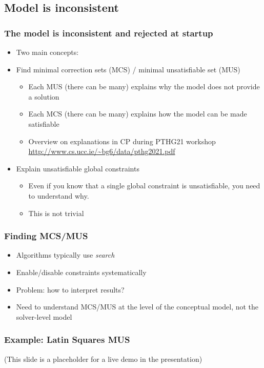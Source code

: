 \documentclass[dvipsnames,aspectratio=169]{beamer}
\begin{document}
\subsection{Model is inconsistent}

\begin{frame}
\frametitle{The model is inconsistent and rejected at startup}
\vspace{5em}
\begin{itemize}
\item Two main concepts:
\item Find minimal correction sets (MCS) / minimal unsatisfiable set (MUS)
\begin{itemize}
\item Each MUS (there can be many) explains why the model does not provide a solution
\item Each MCS (there can be many) explains how the model can be made satisfiable
\item Overview on explanations in CP during PTHG21 workshop \url{http://www.cs.ucc.ie/~bg6/data/pthg2021.pdf}\cite{DBLP:conf/ijcai/GuptaGO21}
\end{itemize}
\item Explain unsatisfiable global constraints
\begin{itemize}
\item Even if you know that a single global constraint is unsatisfiable, you need to understand why.
\item This is not trivial
\end{itemize}
\end{itemize}
\end{frame}

\begin{frame}
\frametitle{Finding MCS/MUS}
\begin{itemize}
\item Algorithms typically use \emph{search}
\item Enable/disable constraints systematically
\item Problem: how to interpret results?
\item Need to understand MCS/MUS at the level of the conceptual model, not the solver-level model
\end{itemize}
\end{frame}

\begin{frame}
\frametitle{Example: Latin Squares MUS}

(This slide is a placeholder for a live demo in the presentation)

\end{frame}
\end{document}
